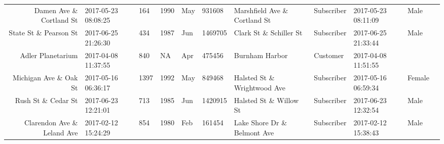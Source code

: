 \documentclass[11pt]{article}
\begin{document}
\begin{tabular}{r|llllllllll}
	 Damen Ave \& Cortland St              & 2017-05-23 08:08:25                    &  164                                   & 1990                                   & May                                    &  931608                                & Marshfield Ave \& Cortland St         & Subscriber                             & 2017-05-23 08:11:09                    & Male                                  \\
	 State St \& Pearson St                & 2017-06-25 21:26:30                    &  434                                   & 1987                                   & Jun                                    & 1469705                                & Clark St \& Schiller St               & Subscriber                             & 2017-06-25 21:33:44                    & Male                                  \\
	 Adler Planetarium                    & 2017-04-08 11:37:55                  &  840                                 &   NA                                 & Apr                                  &  475456                              & Burnham Harbor                       & Customer                             & 2017-04-08 11:51:55                  &                                     \\
	 Michigan Ave \& Oak St                & 2017-05-16 06:36:17                    & 1397                                   & 1992                                   & May                                    &  849468                                & Halsted St \& Wrightwood Ave          & Subscriber                             & 2017-05-16 06:59:34                    & Female                                \\
	 Rush St \& Cedar St                   & 2017-06-23 12:21:01                    &  713                                   & 1985                                   & Jun                                    & 1420915                                & Halsted St \& Willow St               & Subscriber                             & 2017-06-23 12:32:54                    & Male                                  \\
	 Clarendon Ave \& Leland Ave           & 2017-02-12 15:24:29                    &  854                                   & 1980                                   & Feb                                    &  161454                                & Lake Shore Dr \& Belmont Ave          & Subscriber                             & 2017-02-12 15:38:43                    & Male                                  \\

\end{tabular}
\end{document}

